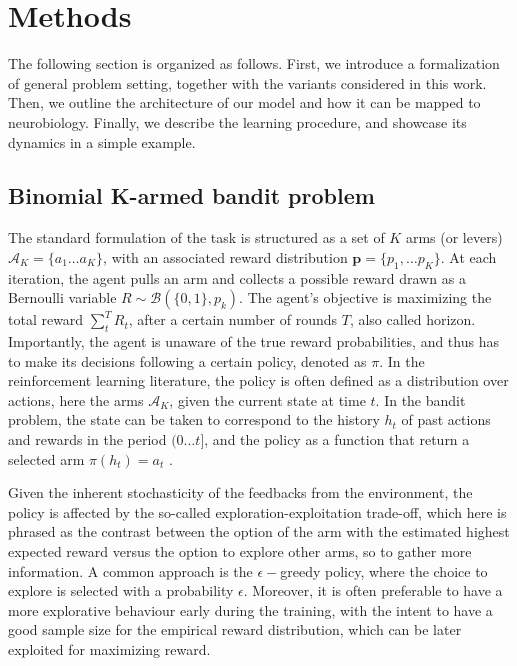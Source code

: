 

\section{Methods}

\noindent The following section is organized as follows. First, we introduce a formalization of general problem setting, together with the variants considered in this work. Then, we outline the architecture of our model and how it can be mapped to neurobiology. Finally, we describe the learning procedure,
and showcase its dynamics in a simple example.

\subsection{Binomial K-armed bandit problem}
\hfill \break
\noindent The standard formulation of the task is structured as a set of $K$ arms (or levers) $\mathcal{A}_{K}=\{a_{1}\ldots a_{K}\}$, with an associated reward distribution $\mathbf{p}=\{p_{1}, \ldots p_{K}\}$.
At each iteration, the agent pulls an arm and collects a possible reward drawn as a Bernoulli variable $R\sim \mathcal{B}(\{0,1\},p_{k})$. The agent's objective is maximizing the total reward $\sum^{T}_{t} R_{t}$, after a certain number of rounds $T$, also called horizon.
Importantly, the agent is unaware of the true reward probabilities, and thus has to make its decisions following a certain policy, denoted as $\pi$.
In the reinforcement learning literature, the policy is often defined as a distribution over actions, here the arms $\mathcal{A}_{K}$, given the current state at time $t$. In the bandit problem, the state can be taken to correspond to the history $h_{t}$ of past actions and rewards in the period
$(0\ldots t]$, and the policy as a function that return a selected arm $\pi(h_{t})=a_{t}$ \cite{qiForcedExplorationBandit2023}.

Given the inherent stochasticity of the feedbacks from the environment, the policy is affected by the so-called exploration-exploitation trade-off, which here is phrased as the contrast between the option of the arm with the estimated highest expected reward versus the option to explore other arms, so to gather more information.
A common approach is the $\epsilon-$greedy policy, where the choice to explore is selected with a probability $\epsilon$.
Moreover, it is often preferable to have a more explorative behaviour early during the training, with the intent to have a good sample size for the empirical reward distribution, which can be later exploited for maximizing reward.

